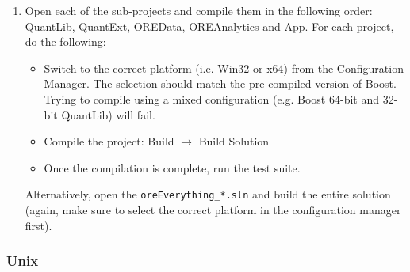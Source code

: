 \documentclass[12pt, a4paper]{article}
\newcommand{\bs}{\textbackslash}
\begin{document}
\begin{enumerate}
%
%
%

\item Open each of the sub-projects and compile them in the following order: QuantLib, QuantExt, OREData, OREAnalytics
  and App. For each project, do the following:

\begin{itemize}
\item Switch to the correct platform (i.e. Win32 or x64) from the Configuration Manager. The selection should match the
  pre-compiled version of Boost. Trying to compile using a mixed configuration (e.g. Boost 64-bit and 32-bit QuantLib)
  will fail.
\item Compile the project: Build $\rightarrow$ Build Solution
\item Once the compilation is complete, run the test suite.
\end{itemize}
Alternatively, open the {\tt oreEverything\_*.sln} and build the entire solution (again, make sure to select the correct platform in the configuration manager first).
\end{enumerate}

\subsubsection*{Unix}
\end{document}
